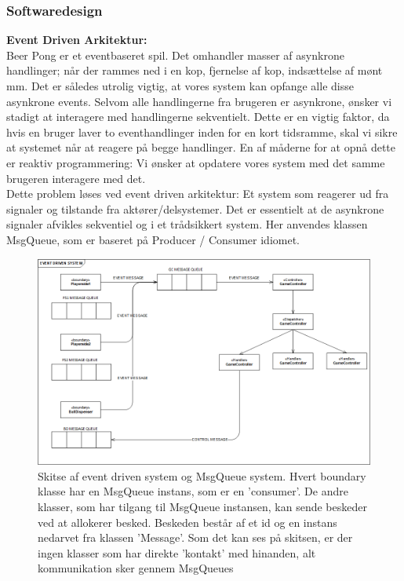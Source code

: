 \documentclass[Rapport/Rapport_main.tex]{subfiles}
\begin{document}
\subsubsection{Softwaredesign}
\textbf{Event Driven Arkitektur:} \\
Beer Pong er et eventbaseret spil. Det omhandler masser af asynkrone handlinger; når der rammes ned i en kop, fjernelse af kop, indsættelse af mønt mm. Det er således utrolig vigtig, at vores system kan opfange alle disse asynkrone events. Selvom alle handlingerne fra brugeren er asynkrone, ønsker vi stadigt at interagere med handlingerne sekventielt. Dette er en vigtig faktor, da hvis en bruger laver to eventhandlinger inden for en kort tidsramme, skal vi sikre at systemet når at reagere på begge handlinger. En af måderne for at opnå dette er reaktiv programmering: Vi ønsker at opdatere vores system med det samme brugeren interagere med det. \\
Dette problem løses ved event driven arkitektur: Et system som reagerer ud fra signaler og tilstande fra aktører/delsystemer. Det er essentielt at de asynkrone signaler afvikles sekventiel og i et trådsikkert system. Her anvendes klassen MsgQueue, som er baseret på Producer / Consumer idiomet. 
\begin{figure}[H]
    \centering
    \includegraphics[width=1\textwidth]{Softwaredesign/RPiApp/graphic_RPi/EDS.png}
    \caption{Skitse af event driven system og MsgQueue system. Hvert boundary klasse har en MsgQueue instans, som er en 'consumer'. De andre klasser, som har tilgang til MsgQueue instansen, kan sende beskeder ved at allokerer besked. Beskeden består af et id og en instans nedarvet fra klassen 'Message'. Som det kan ses på skitsen, er der ingen klasser som har direkte 'kontakt' med hinanden, alt kommunikation sker gennem MsgQueues}
   \label{fig:Sketch_Event}
\end{figure}
\end{document}
